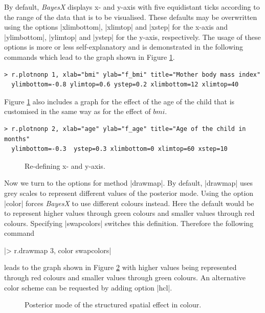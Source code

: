 By default, {\it BayesX} displays x- and y-axis with five equidistant ticks according to the range of the data that is to be
visualised. These defaults may be overwritten using the options |xlimbottom|, |xlimtop| and |xstep| for the x-axis and
|ylimbottom|, |ylimtop| and |ystep| for the y-axis, respectively. The usage of these options is more or less self-explanatory
and is demonstrated in the following commands which lead to the graph shown in Figure \ref{reml:bmi6}.

\begin{verbatim}
> r.plotnonp 1, xlab="bmi" ylab="f_bmi" title="Mother body mass index"
  ylimbottom=-0.8 ylimtop=0.6 ystep=0.2 xlimbottom=12 xlimtop=40
\end{verbatim}

Figure \ref{reml:bmi6} also includes a graph for the effect of the age of the child that is customised in the same way as for
the effect of $\mathit{bmi}$.

\begin{verbatim}
> r.plotnonp 2, xlab="age" ylab="f_age" title="Age of the child in months"
  ylimbottom=-0.3  ystep=0.3 xlimbottom=0 xlimtop=60 xstep=10
\end{verbatim}

\begin{figure}[ht]
\begin{center}
{\it\caption{Re-defining x- and y-axis.\label{reml:bmi6}}}
\end{center}
\end{figure}

Now we turn to the options for method |drawmap|. By default,  |drawmap| uses grey scales to represent different values of the
posterior mode. Using the option |color| forces {\it BayesX} to use different colours instead. Here the default would be to
represent higher values through green colours and smaller values through red colours. Specifying |swapcolors| switches this
definition. Therefore the following command

|> r.drawmap 3, color swapcolors|

leads to the graph shown in Figure \ref{reml:spat3} with higher values being represented through red colours and smaller values
through green colours. An alternative color scheme can be requested by adding option |hcl|.

\begin{figure}[ht]
\begin{center}
{\it\caption{Posterior mode of the structured spatial effect in
colour.\label{reml:spat3}}}
\end{center}
\end{figure}

